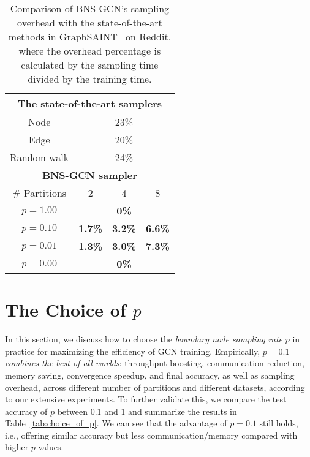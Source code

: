 \documentclass{article}
\begin{document}
\begin{table}[h]
\centering
\caption{Comparison of BNS-GCN's sampling overhead with the state-of-the-art methods in GraphSAINT~\citep{zeng2019graphsaint} on Reddit, where the overhead percentage is calculated by the sampling time divided by the training time.}
\label{tab:overhead}
\begin{tabular}{cccc}
\hline
\multicolumn{4}{c}{The state-of-the-art samplers}                                     \\ \hline
\multicolumn{1}{c|}{Node}          & \multicolumn{3}{c}{23\%}                         \\
\multicolumn{1}{c|}{Edge}          & \multicolumn{3}{c}{20\%}                         \\
\multicolumn{1}{c|}{Random walk}   & \multicolumn{3}{c}{24\%}                         \\ \hline
\multicolumn{4}{c}{\textbf{BNS-GCN sampler}}                                          \\ \hline
\multicolumn{1}{c|}{\# Partitions} & 2              & 4              & 8              \\ \hline
\multicolumn{1}{c|}{$p=1.00$}         & \multicolumn{3}{c}{\textbf{0\%}}                 \\
\multicolumn{1}{c|}{$p=0.10$}       & \textbf{1.7\%} & \textbf{3.2\%} & \textbf{6.6\%} \\
\multicolumn{1}{c|}{$p=0.01$}      & \textbf{1.3\%} & \textbf{3.0\%} & \textbf{7.3\%} \\
\multicolumn{1}{c|}{$p=0.00$}         & \multicolumn{3}{c}{\textbf{0\%}}                 \\
\hline
\end{tabular}
\end{table}

\clearpage

\section{The Choice of $p$}
\label{sec:chocie_p}
In this section, we discuss how to choose the \textit{boundary node sampling rate} $p$ in practice for maximizing the efficiency of GCN training.
Empirically, \textit{$p=0.1$ combines the best of all worlds}: throughput boosting, communication reduction, memory saving, convergence speedup, and final accuracy, as well as sampling overhead, across different number of partitions and different datasets, according to our extensive experiments.
To further validate this, we compare the test accuracy of $p$ between 0.1 and 1 and summarize the results in Table~\ref{tab:choice_of_p}.
We can see that the advantage of $p=0.1$ still holds, i.e., offering similar accuracy but less communication/memory compared with higher $p$ values.
\end{document}
